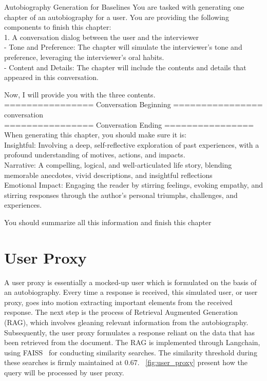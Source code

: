 \begin{mybox}{Autobiography Generation for Baselines}
You are tasked with generating one chapter of an autobiography for a user. You are providing the following components to finish this chapter:\\
1. A conversation dialog between the user and the interviewer \\
- Tone and Preference: The chapter will simulate the interviewer's tone and preference, leveraging the interviewer's oral habits.\\
- Content and Details: The chapter will include the contents and details that appeared in this conversation.

Now, I will provide you with the three contents.\\
================ Conversation Beginning ================\\
{conversation}\\
================ Conversation Ending ================\\

When generating this chapter, you should make sure it is:\\
Insightful: Involving a deep, self-reflective exploration of past experiences, with a profound understanding of motives, actions, and impacts. \\
Narrative: A compelling, logical, and well-articulated life story, blending memorable anecdotes, vivid descriptions, and insightful reflections\\
Emotional Impact: Engaging the reader by stirring feelings, evoking empathy, and stirring responses through the author's personal triumphs, challenges, and experiences.

You should summarize all this information and finish this chapter
\end{mybox}


\section{User Proxy}\label{appendix:user_proxy}
A user proxy is essentially a mocked-up user which is formulated on the basis of an autobiography. Every time a response is received, this simulated user, or user proxy, goes into motion extracting important elements from the received response. The next step is the process of Retrieval Augmented Generation (RAG), which involves gleaning relevant information from the autobiography. Subsequently, the user proxy formulates a response reliant on the data that has been retrieved from the document. The RAG is implemented through Langchain, using FAISS~\cite{douze2024faiss} for conducting similarity searches. The similarity threshold during these searches is firmly maintained at 0.67.
~\cref{fig:user_proxy} present how the query will be processed by user proxy.


